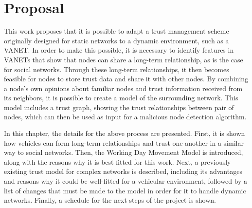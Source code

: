 \chapter{Proposal}
\label{chap:proposal}

This work proposes that it is possible to adapt a trust management scheme originally designed for static networks to a dynamic environment, such as a VANET.
In order to make this possible, it is necessary to identify features in VANETs that show that nodes can share a long-term relationship, as is the case for social networks.
Through these long-term relationships, it then becomes feasible for nodes to store trust data and share it with other nodes.
By combining a node's own opinions about familiar nodes and trust information received from its neighbors, it is possible to create a model of the surrounding network.
This model includes a trust graph, showing the trust relationships between pair of nodes, which can then be used as input for a malicious node detection algorithm.


In this chapter, the details for the above process are presented.
First, it is shown how vehicles can form long-term relationships and trust one another in a similar way to social networks.
Then, the Working Day Movement Model is introduced, along with the reasons why it is best fitted for this work.
Next, a previously existing trust model for complex networks is described, including its advantages and reasons why it could be well-fitted for a vehicular environment, followed by a list of changes that must be made to the model in order for it to handle dynamic networks.
Finally, a schedule for the next steps of the project is shown.


